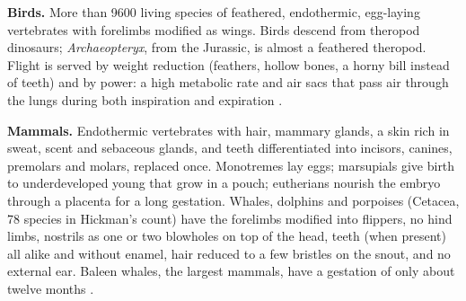\textbf{Birds.} More than 9600 living species
of feathered, endothermic, egg-laying
vertebrates with forelimbs modified as wings.
Birds descend from theropod dinosaurs;
\emph{Archaeopteryx}, from the Jurassic, is
almost a feathered theropod. Flight is served
by weight reduction (feathers, hollow bones,
a horny bill instead of teeth) and by power:
a high metabolic rate and air sacs that pass
air through the lungs during both inspiration
and expiration \cite[Chapter
19]{hickman2002animal}.

\textbf{Mammals.} Endothermic vertebrates
with hair, mammary glands, a skin rich in
sweat, scent and sebaceous glands, and teeth
differentiated into incisors, canines,
premolars and molars, replaced once.
Monotremes lay eggs; marsupials give birth to
underdeveloped young that grow in a pouch;
eutherians nourish the embryo through a
placenta for a long gestation. Whales,
dolphins and porpoises (Cetacea, 78 species
in Hickman's count) have the forelimbs
modified into flippers, no hind limbs,
nostrils as one or two blowholes on top of
the head, teeth (when present) all alike and
without enamel, hair reduced to a few
bristles on the snout, and no external ear.
Baleen whales, the largest mammals, have a
gestation of only about twelve months
\cite[Chapter 20]{hickman2002animal}.





